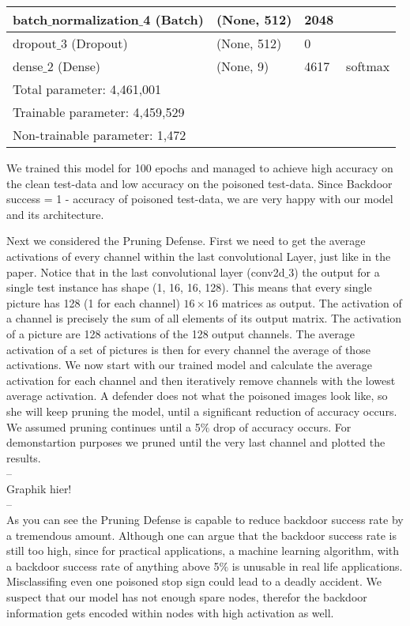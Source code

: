 \documentclass[a4paper,12pt]{article}
\begin{document}
\begin{center}
\begin{tabular}{|l l l l|}
	batch$\_$normalization$\_$4 (Batch) & (None, 512)    & 2048   &\\ \hline
	dropout$\_$3 (Dropout) & (None, 512)    & 0  & \\ \hline
	dense$\_$2 (Dense) & (None, 9)    & 4617  & softmax\\ \hline \hline
	Total parameter: 4,461,001 & & & \\
	Trainable parameter: 4,459,529 & & & \\
	Non-trainable parameter: 1,472 & & & \\ \hline
\end{tabular} 
\end{center}
We trained this model for 100 epochs and managed to achieve high accuracy on the clean test-data and low accuracy on the poisoned test-data. Since Backdoor success = 1 - accuracy of poisoned test-data, we are very happy with our model and its architecture. 

Next we considered the Pruning Defense. First we need to get the average activations of every channel within the last convolutional Layer, just like in the paper. Notice that in the last convolutional layer (conv2d$\_$3) the output for a single test instance has shape (1, 16, 16, 128). This means that every single picture has 128 (1 for each channel) $16 \times 16$ matrices as output. The activation of a channel is precisely the sum of all elements of its output matrix. The activation of a picture are 128 activations of the 128 output channels. The average activation of a set of pictures is then for every channel the average of those activations. We now start with our trained model and calculate the average activation for each channel and then iteratively remove channels with the lowest average activation. A defender does not what the poisoned images look like, so she will keep pruning the model, until a significant reduction of accuracy occurs. We assumed pruning continues until a 5$\%$ drop of accuracy occurs. For demonstartion purposes we pruned until the very last channel and plotted the results.
\\
--\\
Graphik hier!\\
--\\
As you can see the Pruning Defense is capable to reduce backdoor success rate by a tremendous amount. Although one can argue that the backdoor success rate is still too high, since for practical applications, a machine learning algorithm, with a backdoor success rate of anything above 5$\%$ is unusable in real life applications. Misclassifing even one poisoned stop sign could lead to a deadly accident. We suspect that our model has not enough spare nodes, therefor the backdoor information gets encoded within nodes with high activation as well. 
\end{document}
